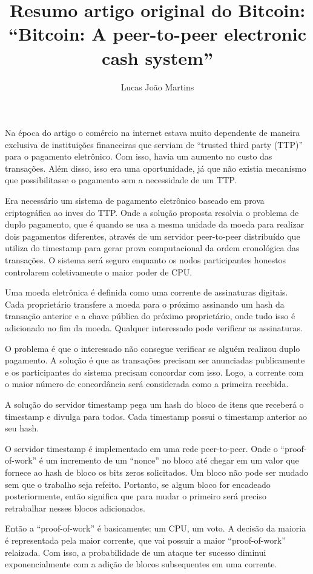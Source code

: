 \documentclass[12pt]{article}
\title{Resumo artigo original do Bitcoin:
    \\
    \large{``Bitcoin: A peer-to-peer electronic cash system''} }
\author{Lucas João Martins}
\date{}
\begin{document}
\maketitle

Na época do artigo o comércio na internet estava muito dependente de maneira
exclusiva de instituições financeiras que serviam de ``trusted third party
(TTP)'' para o pagamento eletrônico. Com isso, havia um aumento no custo das
transações. Além disso, isso era uma oportunidade, já que não existia mecanismo
que possibilitasse o pagamento sem a necessidade de um TTP.

Era necessário um sistema de pagamento eletrônico baseado em prova criptográfica
ao inves do TTP. Onde a solução proposta resolvia o problema de duplo pagamento,
que é quando se usa a mesma unidade da moeda para realizar dois pagamentos
diferentes, através de um servidor peer-to-peer distribuído que utiliza do
timestamp para gerar prova computacional da ordem cronológica das transações. O
sistema será seguro enquanto os nodos participantes honestos controlarem
coletivamente o maior poder de CPU.

Uma moeda eletrônica é definida como uma corrente de assinaturas digitais. Cada
proprietário transfere a moeda para o próximo assinando um hash da transação
anterior e a chave pública do próximo proprietário, onde tudo isso é adicionado
no fim da moeda. Qualquer interessado pode verificar as assinaturas.

O problema é que o interessado não consegue verificar se alguém realizou duplo
pagamento. A solução é que as transações precisam ser anunciadas publicamente e
os participantes do sistema precisam concordar com isso. Logo, a corrente com o
maior número de concordância será considerada como a primeira recebida.

A solução do servidor timestamp pega um hash do bloco de itens que receberá o
timestamp e divulga para todos. Cada timestamp possui o timestamp anterior ao
seu hash.

O servidor timestamp é implementado em uma rede peer-to-peer. Onde o
``proof-of-work'' é um incremento de um ``nonce'' no bloco até chegar em um
valor que fornece ao hash de bloco os bits zeros solicitados. Um bloco não pode
ser mudado sem que o trabalho seja refeito. Portanto, se algum bloco for
encadeado posteriormente, então significa que para mudar o primeiro será preciso
retrabalhar nesses blocos adicionados.

Então a ``proof-of-work'' é basicamente: um CPU, um voto. A decisão da maioria é
representada pela maior corrente, que vai possuir a maior ``proof-of-work''
relaizada. Com isso, a probabilidade de um ataque ter sucesso diminui
exponencialmente com a adição de blocos subsequentes em uma corrente.
\end{document}
